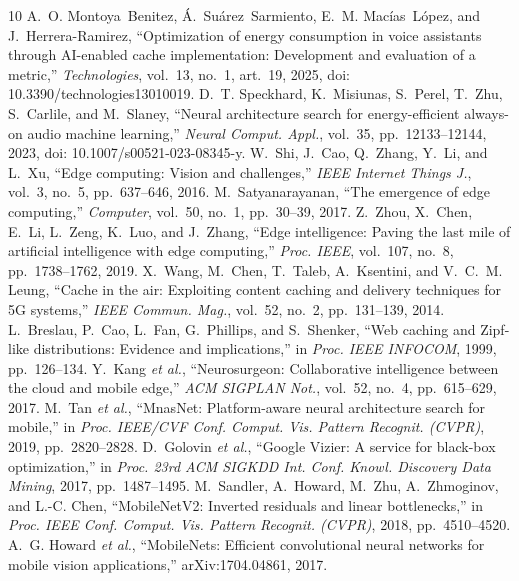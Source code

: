 \documentclass[journal]{IEEEtran}
\begin{document}
\begin{thebibliography}{10}
 A.~O. Montoya~Benitez, \'A.~Su\'arez~Sarmiento, E.~M. Mac\'ias~L\'opez, and J.~Herrera-Ramirez, ``Optimization of energy consumption in voice assistants through AI-enabled cache implementation: Development and evaluation of a metric,'' \emph{Technologies}, vol.~13, no.~1, art.~19, 2025, doi: 10.3390/technologies13010019.
 D.~T. Speckhard, K.~Misiunas, S.~Perel, T.~Zhu, S.~Carlile, and M.~Slaney, ``Neural architecture search for energy-efficient always-on audio machine learning,'' \emph{Neural Comput. Appl.}, vol.~35, pp.~12133--12144, 2023, doi: 10.1007/s00521-023-08345-y.
 W.~Shi, J.~Cao, Q.~Zhang, Y.~Li, and L.~Xu, ``Edge computing: Vision and challenges,'' \emph{IEEE Internet Things J.}, vol.~3, no.~5, pp.~637--646, 2016.
 M.~Satyanarayanan, ``The emergence of edge computing,'' \emph{Computer}, vol.~50, no.~1, pp.~30--39, 2017.
 Z.~Zhou, X.~Chen, E.~Li, L.~Zeng, K.~Luo, and J.~Zhang, ``Edge intelligence: Paving the last mile of artificial intelligence with edge computing,'' \emph{Proc. IEEE}, vol.~107, no.~8, pp.~1738--1762, 2019.
 X.~Wang, M.~Chen, T.~Taleb, A.~Ksentini, and V.~C.~M. Leung, ``Cache in the air: Exploiting content caching and delivery techniques for 5G systems,'' \emph{IEEE Commun. Mag.}, vol.~52, no.~2, pp.~131--139, 2014.
 L.~Breslau, P.~Cao, L.~Fan, G.~Phillips, and S.~Shenker, ``Web caching and Zipf-like distributions: Evidence and implications,'' in \emph{Proc. IEEE INFOCOM}, 1999, pp.~126--134.
 Y.~Kang \emph{et al.}, ``Neurosurgeon: Collaborative intelligence between the cloud and mobile edge,'' \emph{ACM SIGPLAN Not.}, vol.~52, no.~4, pp.~615--629, 2017.
 M.~Tan \emph{et al.}, ``MnasNet: Platform-aware neural architecture search for mobile,'' in \emph{Proc. IEEE/CVF Conf. Comput. Vis. Pattern Recognit. (CVPR)}, 2019, pp.~2820--2828.
 D.~Golovin \emph{et al.}, ``Google Vizier: A service for black-box optimization,'' in \emph{Proc. 23rd ACM SIGKDD Int. Conf. Knowl. Discovery Data Mining}, 2017, pp.~1487--1495.
 M.~Sandler, A.~Howard, M.~Zhu, A.~Zhmoginov, and L.-C. Chen, ``MobileNetV2: Inverted residuals and linear bottlenecks,'' in \emph{Proc. IEEE Conf. Comput. Vis. Pattern Recognit. (CVPR)}, 2018, pp.~4510--4520.
 A.~G. Howard \emph{et al.}, ``MobileNets: Efficient convolutional neural networks for mobile vision applications,'' arXiv:1704.04861, 2017.

\end{thebibliography}
\end{document}
